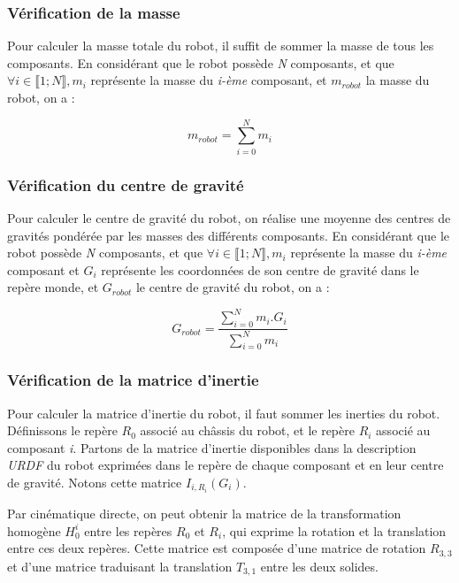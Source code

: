 			\subsubsection{Vérification de la masse}

				Pour calculer la masse totale du robot, il suffit de sommer la masse de tous les composants. En considérant que le robot possède \textit{N} composants, et que $\forall i \in \llbracket 1; N \rrbracket, m_i$ représente la masse du \textit{i-ème} composant, et $m_{robot}$ la masse du robot, on a :

				\begin{equation}
					m_{robot} = \sum_{i=0}^{N}m_i
				\end{equation}

			\subsubsection{Vérification du centre de gravité}

				Pour calculer le centre de gravité du robot, on réalise une moyenne des centres de gravités pondérée par les masses des différents composants. En considérant que le robot possède \textit{N} composants, et que $\forall i \in \llbracket 1; N \rrbracket, m_i$ représente la masse du \textit{i-ème} composant et $G_i$ représente les coordonnées de son centre de gravité dans le repère monde, et $G_{robot}$ le centre de gravité du robot, on a :

				\begin{equation}
					G_{robot} = \frac{\sum_{i=0}^{N}m_i.G_i}{\sum_{i=0}^{N}m_i}
				\end{equation}

			\subsubsection{Vérification de la matrice d'inertie}

				Pour calculer la matrice d'inertie du robot, il faut sommer les inerties du robot. Définissons le repère $R_0$ associé au châssis du robot, et le repère $R_i$ associé au composant \textit{i}. Partons de la matrice d'inertie disponibles dans la description \textit{URDF} du robot exprimées dans le repère de chaque composant et en leur centre de gravité. Notons cette matrice $I_{i, R_i}(G_i)$. 
				
				Par cinématique directe, on peut obtenir la matrice de la transformation homogène $H_0^i$ entre les repères $R_0$ et $R_i$, qui exprime la rotation et la translation entre ces deux repères. Cette matrice est composée d'une matrice de rotation $R_{3, 3}$ et d'une matrice traduisant la translation $T_{3, 1}$ entre les deux solides.

